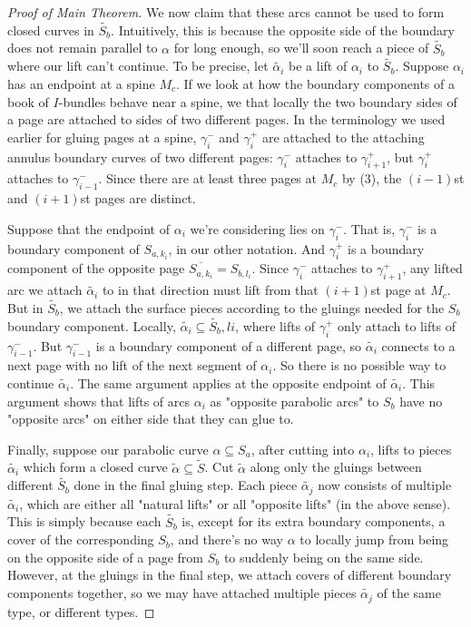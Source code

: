 \documentclass[12pt]{amsart}
\theoremstyle{definition}
\theoremstyle{remark}
\newcommand{\cin}{\subseteq}
\begin{document}
\begin{proof}[Proof of Main Theorem]
We now claim that these arcs cannot be used to form closed curves in $\widetilde{S_b}$.
Intuitively, this is because the opposite side of the boundary does not remain
parallel to $\alpha$ for long enough, so we'll soon reach a piece of $\widetilde{S_b}$
where our lift can't continue.  To be precise, let $\widetilde{\alpha_i}$ be a lift of
$\alpha_i$ to $\widetilde{S_b}$.  Suppose $\alpha_i$ has an endpoint at a spine $M_c$. If we
look at how the boundary components of a book of $I$-bundles behave near
a spine, we that locally the two boundary sides of a page are attached to sides
of two different pages.  In the terminology we used earlier for gluing pages at
a spine, $\gamma_i^-$ and $\gamma_i^+$ are attached to the attaching annulus boundary
curves of two different pages: $\gamma_i^-$ attaches to $\gamma_{i+1}^+$, but
$\gamma_i^+$ attaches to $\gamma_{i-1}^-$.  Since there are at least three pages at
$M_c$ by (3), the $(i-1)$st and $(i+1)$st pages are distinct.

Suppose that the endpoint of $\alpha_i$ we're considering lies on $\gamma_i^-$. That
is, $\gamma_i^-$ is a boundary component of $S_{a,k_i}$, in our other notation. And
$\gamma_i^+$ is a boundary component of the opposite page $\overline{S_{a,k_i}} = S_{b,l_i}$.
Since $\gamma_i^-$ attaches to $\gamma_{i+1}^+$, any lifted arc we attach
$\widetilde{\alpha_i}$ to in that direction must lift from that $(i+1)$st page at $M_c$.
But in $\widetilde{S_b}$, we attach the surface pieces according to the gluings needed
for the $S_b$ boundary component.  Locally, $\widetilde{\alpha_i} \cin \widetilde{S_b},li$, where
lifts of $\gamma_i^+$ only attach to lifts of $\gamma_{i-1}^-$. But $\gamma_{i-1}^-$ is
a boundary component of a different page, so $\widetilde{\alpha_i}$ connects to a next
page with no lift of the next segment of $\alpha_i$. So there is no possible way
to continue $\widetilde{\alpha_i}$.  The same argument applies at the opposite endpoint
of $\widetilde{\alpha_i}$. This argument shows that lifts of arcs $\alpha_i$ as "opposite
parabolic arcs" to $S_b$ have no "opposite arcs" on either side that they can
glue to.

Finally, suppose our parabolic curve $\alpha \cin S_a$, after cutting into
$\alpha_i$, lifts to pieces $\widetilde{\alpha_i}$ which form a closed curve $\widetilde{\alpha}
\cin \widetilde{S}$.  Cut $\widetilde{\alpha}$ along only the gluings between different
$\widetilde{S_b}$ done in the final gluing step. Each piece $\widetilde{\alpha_j}$ now consists
of multiple $\widetilde{\alpha_i}$, which are either all "natural lifts" or all
"opposite lifts" (in the above sense). This is simply because each $\widetilde{S_b}$
is, except for its extra boundary components, a cover of the corresponding
$S_b$, and there's no way $\alpha$ to locally jump from being on the opposite
side of a page from $S_b$ to suddenly being on the same side. However, at the
gluings in the final step, we attach covers of different boundary components
together, so we may have attached multiple pieces $\widetilde{\alpha_j}$ of the same
type, or different types.


\end{proof}
\end{document}
